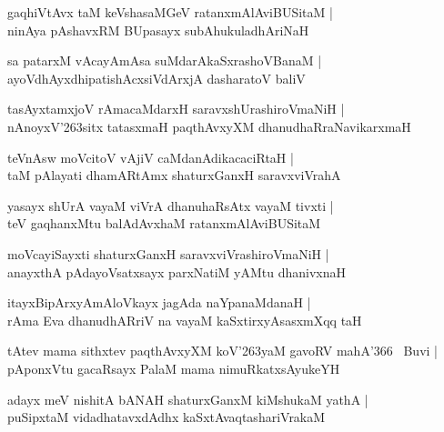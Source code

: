 \documentclass[twoside,12pt,openright]{book}
\def\S{\char'263}
\newcounter{shloka}[chapter]
\begin{document}
\begin{shloka}%
gaqhiVtAvx taM keVshasaMGeV ratanxmAlAviBUSitaM |\\
ninAya pAshavxRM BUpasayx subAhukuladhAriNaH
\end{shloka}

\begin{shloka}%
sa patarxM vAcayAmAsa suMdarAkaSxrashoVBanaM |\\
ayoVdhAyxdhipatishAcxsiVdArxjA dasharatoV baliV
\end{shloka}

\begin{shloka}%
tasAyxtamxjoV rAmacaMdarxH saravxshUrashiroVmaNiH |\\
nAnoyxV\S sitx tatasxmaH paqthAvxyXM dhanudhaRraNavikarxmaH 
\end{shloka}

\begin{shloka}%
teVnAsw moVcitoV vAjiV caMdanAdikacaciRtaH |\\
taM pAlayati dhamARtAmx shaturxGanxH saravxviVrahA
\end{shloka}

\begin{shloka}%
yasayx shUrA vayaM viVrA dhanuhaRsAtx vayaM tivxti |\\
teV gaqhanxMtu balAdAvxhaM ratanxmAlAviBUSitaM 
\end{shloka}

\begin{shloka}%
moVcayiSayxti shaturxGanxH saravxviVrashiroVmaNiH |\\
anayxthA pAdayoVsatxsayx parxNatiM yAMtu dhanivxnaH 
\end{shloka}

\begin{shloka}%
itayxBipArxyAmAloVkayx jagAda naYpanaMdanaH |\\
rAma Eva dhanudhARriV na vayaM kaSxtirxyAsasxmXqq taH 
\end{shloka}

\begin{shloka}%
tAtev mama sithxtev paqthAvxyXM  koV\S yaM gavoRV mahA\char'366 ~Buvi |\\
pAponxVtu gacaRsayx PalaM mama nimuRkatxsAyukeYH 
\end{shloka}

\begin{shloka}%
adayx meV nishitA bANAH shaturxGanxM kiMshukaM yathA |\\
puSipxtaM vidadhatavxdAdhx kaSxtAvaqtashariVrakaM 
\end{shloka}
\end{document}
